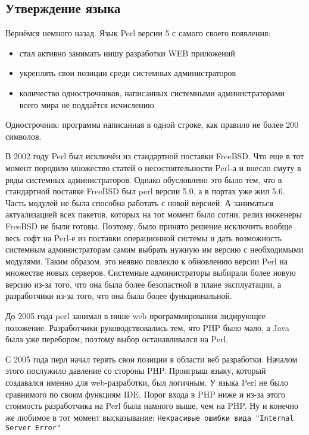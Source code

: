 \subsection{Утверждение языка}
Вернёмся немного назад. Язык Perl версии 5 с самого своего появления:
\begin{itemize}
 \item стал активно занимать нишу разработки WEB приложений
 \item укреплять свои позиции среди системных администраторов
 \item количество однострочников, написанных системными администраторами всего мира не поддаётся исчислению
\end{itemize}

Однострочник: программа написанная в одной строке, как правило не более 200 символов.

В 2002 году Perl был исключён из стандартной поставки FreeBSD. Что еще в тот момент породило множество статей  о несостоятельности Perl-а и внесло смуту в ряды системных администраторов. Однако обусловлено это было тем, что в стандартной поставке FreeBSD был perl версии 5.0, а в портах уже жил 5.6. Часть модулей не была способна работать с новой версией. А заниматься актуализацией всех пакетов, которых на тот момент было сотни, релиз инженеры FreeBSD не были готовы. Поэтому, было принято решение исключить вообще весь софт на Perl-е из поставки операционной системы и дать возможность системным администраторам самим выбрать нужную им версию с необходимыми модулями. Таким образом, это неявно повлекло к обновлению версии Perl на множестве новых серверов. Системные администраторы выбирали более новую версию из-за того, что она была более безопастной в плане эксплуатации, а разработчики из-за того, что она была более функциональной.

До 2005 года perl занимал в нише web программирования лидирующее положение. Разработчики руководствовались тем, что PHP было мало, а Java была уже перебором, поэтому выбор останавливался на Perl.

С 2005 года перл начал терять свои позиции в области веб разработки. Началом этого послужило давление со стороны PHP. Проигрыш языку, который создавался именно для web-разработки, был логичным. У языка Perl не было сравнимого по своим функциям IDE. Порог входа в PHP ниже и из-за этого стоимость разработчика на Perl была намного выше, чем на PHP. Ну и конечно же любимое в тот момент высказывание: \verb|Некрасивые ошибки вида "Internal Server Error"|


